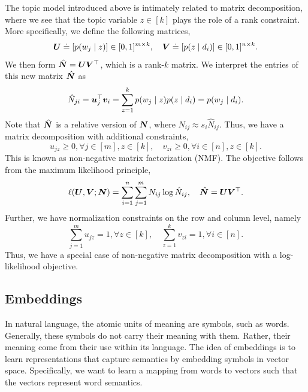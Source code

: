 The topic model introduced above is intimately related to matrix decomposition, where we see that
the topic variable $z \in [k]$ plays the role of a rank constraint. More specifically, we define
the following matrices, \[
    \bm{U} \doteq [p(w_j \mid z)] \in [0,1]^{m \times k}, \quad \bm{V} \doteq [p(z \mid d_i)] \in [0,1]^{n \times k}.
\]
We then form $\hat{\bm{N}} = \bm{U} \bm{V}^\top$, which is a rank-$k$ matrix. We
interpret the entries of this new matrix $\hat{\bm{N}}$ as \[
    \hat{N}_{ji} = \bm{u}_j^\top \bm{v}_i = \sum_{z=1}^{k} p(w_j \mid z) p(z \mid d_i) = p(w_j \mid d_i).
\]
Note that $\hat{\bm{N}}$ is a relative version of $\bm{N}$, where $N_{ij} \approx s_i
    \hat{N}_{ij}$. Thus, we have a matrix decomposition with additional constraints, \[
    u_{jz} \geq 0, \forall j \in [m], z \in [k], \quad v_{zi} \geq 0, \forall i \in [n], z \in [k].
\]
This is known as non-negative matrix factorization (NMF). The objective follows from the maximum
likelihood principle, \[
    \ell(\bm{U}, \bm{V}; \bm{N}) = \sum_{i=1}^{n} \sum_{j=1}^{m} N_{ij} \log \hat{N}_{ij}, \quad \hat{\bm{N}} = \bm{U} \bm{V}^\top.
\]
Further, we have normalization constraints on the row and column level, namely \[
    \sum_{j=1}^{m} u_{jz} = 1, \forall z \in [k], \quad \sum_{z=1}^{k} v_{zi} = 1, \forall i \in [n].
\]
Thus, we have a special case of non-negative matrix decomposition with a log-likelihood objective.

\subsection{Embeddings}

In natural language, the atomic units of meaning are symbols, such as words. Generally, these
symbols do not carry their meaning with them. Rather, their meaning come from their use within its
language. The idea of embeddings is to learn representations that capture semantics by embedding
symbols in vector space. Specifically, we want to learn a mapping from words to vectors such that
the vectors represent word semantics.

